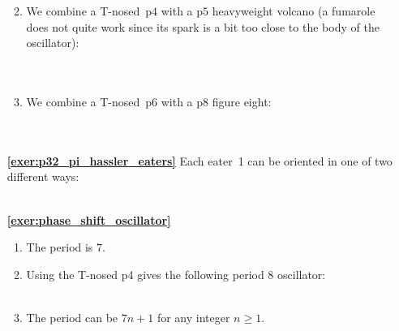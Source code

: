 \begin{multicols}{2}
\begin{itemize}[leftmargin=0em]
\begin{enumerate}[leftmargin=1.5em,label=\bf\color{ocre}(\alph*)]
			
			\item We combine a T-nosed~p$4$ with a p$5$ heavyweight volcano (a fumarole does not quite work since its spark is a bit too close to the body of the oscillator): \\[-0.6em]
			
			 \\[-0.8em]
			
			 \\
			
			\item We combine a T-nosed~p$6$ with a p$8$ figure eight: \\[-0.6em]
			
			 \\[-0.8em]
			
			 \\
		\end{enumerate}
	

		\item[\bf\color{ocre}\sffamily\ref{exer:p32_pi_hassler_eaters}] Each eater~1 can be oriented in one of two different ways:\\[-0.6em]
		
		 \\
		
		
		\item[\bf\color{ocre}\sffamily\ref{exer:phase_shift_oscillator}] \begin{enumerate}[leftmargin=1.5em,label=\bf\color{ocre}(\alph*)]
			\item The period is $7$.
			
			\item Using the T-nosed p4 gives the following period 8 oscillator:\\[-0.6em]
			
			 \\[-0.5em]
			
			\item The period can be $7n + 1$ for any integer $n \geq 1$.\\
		\end{enumerate}
		

\end{itemize}
\end{multicols}
